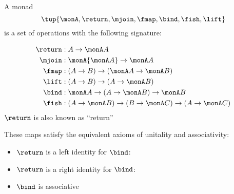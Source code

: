 \begin{definition}\label{def:monad-computer-science}
  A monad \begin{equation}
    \tup{ \monA,\return,\mjoin,\fmap,\bind,\fish,\lift} 
  \end{equation}
  is a set of operations with the following signature:
  
  \begin{align*}
  \return & :A\to\monA A\\
  \mjoin & :\monA{\monA A}\to\monA A\\
  \fmap & :(A\to B)\to(\monA A\to\monA B)\\
  \lift & :(A\to B)\to( A\to\monA B)\\
  \bind & :\monA A\to(A\to\monA B)\to\monA B\\
  \fish & :(A\to\monA B)\to(B\to\monA C)\to(A\to\monA C)
  \end{align*}
  $\return$ is also known as ``return''
  
  These maps satisfy the equivalent axioms of unitality and associativity:
  \begin{itemize}
  \item $\return$ is a left identity for $\bind$:
  
  \item $\return$ is a right identity for $\bind$:
  
  \item $\bind$ is associative
  
  \end{itemize}
\end{definition}